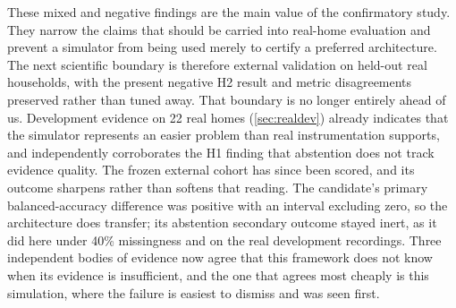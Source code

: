 \documentclass[11pt]{article}
\begin{document}
These mixed and negative findings are the main value of the confirmatory study. They narrow the claims that should be carried into real-home evaluation and prevent a simulator from being used merely to certify a preferred architecture. The next scientific boundary is therefore external validation on held-out real households, with the present negative H2 result and metric disagreements preserved rather than tuned away. That boundary is no longer entirely ahead of us. Development evidence on 22 real homes (\cref{sec:realdev}) already indicates that the simulator represents an easier problem than real instrumentation supports, and independently corroborates the H1 finding that abstention does not track evidence quality. The frozen external cohort has since been scored, and its outcome sharpens rather than softens that reading. The candidate's primary balanced-accuracy difference was positive with an interval excluding zero, so the architecture does transfer; its abstention secondary outcome stayed inert, as it did here under 40\% missingness and on the real development recordings. Three independent bodies of evidence now agree that this framework does not know when its evidence is insufficient, and the one that agrees most cheaply is this simulation, where the failure is easiest to dismiss and was seen first.

\printbibliography
\end{document}
